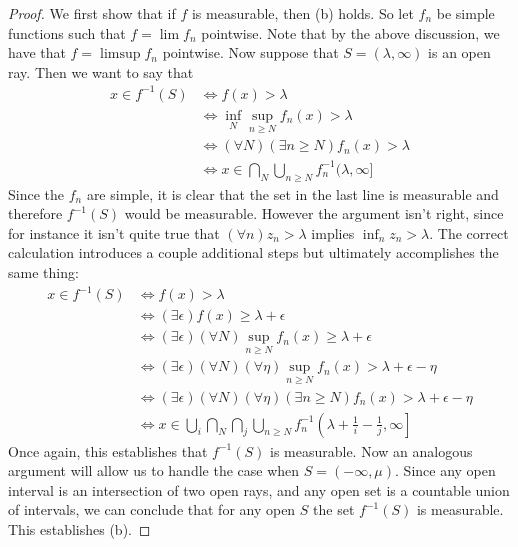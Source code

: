 \documentclass[11pt,oneside]{amsbook}
\theoremstyle{definition}
\theoremstyle{plain}
\theoremstyle{definition}
\theoremstyle{remark}
\numberwithin{equation}{section}
\numberwithin{figure}{section}
\begin{document}
\begin{proof}
  We first show that if $f$ is measurable, then (b) holds. So let $f_n$ be simple functions such that $f=\lim f_n$ pointwise. Note that by the above discussion, we have that $f=\limsup f_n$ pointwise. Now suppose that $S=(\lambda,\infty)$ is an open ray. Then we want to say that
  \begin{align*}
    x\in f^{-1}(S)&\iff f(x)>\lambda\\
          &\iff \inf_N\sup_{n\geq N}f_n(x)>\lambda\\
          &\iff (\forall N)(\exists n\geq N)f_n(x)>\lambda\\
          &\iff x\in\bigcap_N\bigcup_{n\geq N}f_n^{-1}(\lambda,\infty]
  \end{align*}
  Since the $f_n$ are simple, it is clear that the set in the last line is measurable and therefore $f^{-1}(S)$ would be measurable. However the argument isn't right, since for instance it isn't quite true that $(\forall n)z_n>\lambda$ implies $\inf_n z_n>\lambda$. The correct calculation introduces a couple additional steps but ultimately accomplishes the same thing:
  \begin{align*}
    x\in f^{-1}(S)&\iff f(x)>\lambda\\
          &\iff (\exists\epsilon)f(x)\geq \lambda+\epsilon\\
          &\iff (\exists\epsilon)(\forall N)\sup_{n\geq N} f_n(x)\geq\lambda+\epsilon\\
          &\iff (\exists\epsilon)(\forall N)(\forall\eta)\sup_{n\geq N}f_n(x)>\lambda+\epsilon-\eta\\
          &\iff (\exists\epsilon)(\forall N)(\forall\eta)(\exists n\geq N)f_n(x)>\lambda+\epsilon-\eta\\
          &\iff x\in\bigcup_i\bigcap_N\bigcap_j\bigcup_{n\geq N}f_n^{-1}\left(\lambda+\frac1i-\frac1j,\infty\right]
  \end{align*}
  Once again, this establishes that $f^{-1}(S)$ is measurable. Now an analogous argument will allow us to handle the case when $S=(-\infty,\mu)$. Since any open interval is an intersection of two open rays, and any open set is a countable union of intervals, we can conclude that for any open $S$ the set $f^{-1}(S)$ is measurable. This establishes (b).


\end{proof}
\end{document}
